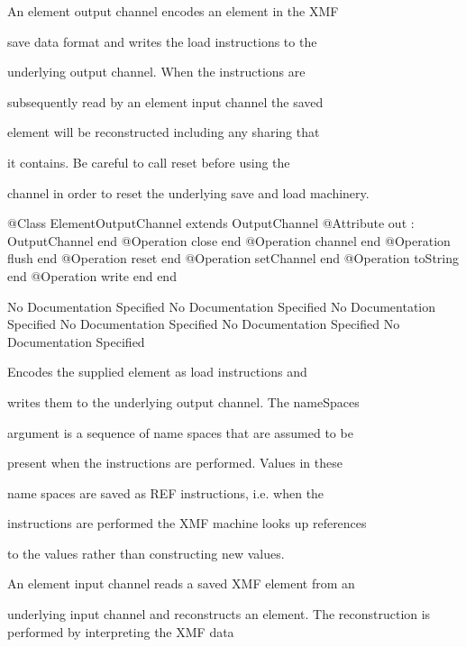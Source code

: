       An element output channel encodes an element in the XMF

      save data format and writes the load instructions to the

      underlying output channel. When the instructions are

      subsequently read by an element input channel the saved

      element will be reconstructed including any sharing that

      it contains. Be careful to call reset before using the

      channel in order to reset the underlying save and load 
      machinery.
\begin{Interface}
@Class ElementOutputChannel extends OutputChannel
  @Attribute out : OutputChannel end
  @Operation close end
  @Operation channel end
  @Operation flush end
  @Operation reset end
  @Operation setChannel end
  @Operation toString end
  @Operation write end
end
\end{Interface}
No Documentation Specified
No Documentation Specified
No Documentation Specified
No Documentation Specified
No Documentation Specified
No Documentation Specified

        Encodes the supplied element as load instructions and

        writes them to the underlying output channel. The nameSpaces

        argument is a sequence of name spaces that are assumed to be

        present when the instructions are performed. Values in these

        name spaces are saved as REF instructions, i.e. when the

        instructions are performed the XMF machine looks up references

        to the values rather than constructing new values.

      An element input channel reads a saved XMF element from an

      underlying input channel and reconstructs an element. The 
      reconstruction is performed by interpreting the XMF data


